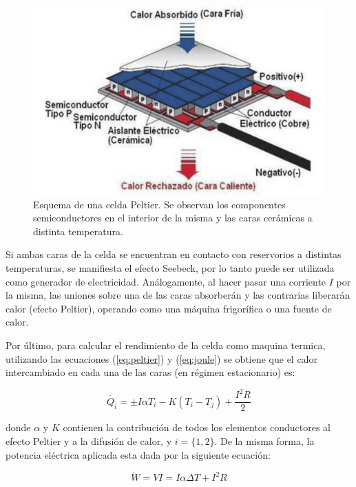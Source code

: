 \documentclass[twoside,twocolumn,a4paper]{article}
\begin{document}
\begin{figure}[H]
\includegraphics[width=\linewidth]{celda.jpg}
\caption{Esquema de una celda Peltier. Se observan los componentes semiconductores en el interior de la misma y las caras cer\'amicas a distinta temperatura.}
\label{fig:celda}
\end{figure}

Si ambas caras de la celda se encuentran en contacto con reservorios a distintas temperaturas, se manifiesta el efecto Seebeck, por lo tanto puede ser utilizada como generador de electricidad. An\'alogamente, al hacer pasar una corriente $I$ por la misma, las uniones sobre una de las caras absorber\'an y las contrarias liberar\'an calor (efecto Peltier), operando como una m\'aquina frigor\'ifica o una fuente de calor.

Por \'ultimo, para calcular el rendimiento de la celda como maquina termica, utilizando las ecuaciones (\ref{eq:peltier}) y (\ref{eq:joule}) se obtiene que el calor intercambiado en cada una de las caras (en r\'egimen estacionario) es:

\begin{equation}
\label{eq:qcaras}
\dot{Q_{i}} = \pm I\alpha T_{i} - K(T_{i} - T_{j}) + \frac{I^{2}R}{2}
\end{equation}


donde $\alpha$ y $K$ contienen la contribuci\'on de todos los elementos conductores al efecto Peltier y a la difusi\'on de calor, y $i = \{1,2\}$. De la misma forma, la potencia el\'ectrica aplicada esta dada por la siguiente ecuaci\'on:

\begin{equation}
\label{eq:potencia}
\dot{W} = VI = I \alpha \Delta T + I^{2}R
\end{equation}
\end{document}
